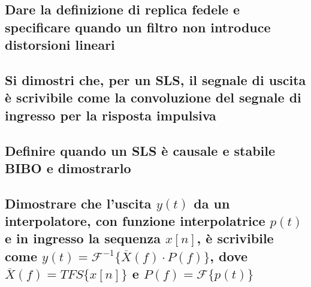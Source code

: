 \documentclass[12pt,oneside,openany]{memoir}
\numberwithin{equation}{subsection}
\begin{document}
\subsection{Dare la definizione di replica fedele e specificare quando un filtro
non introduce distorsioni lineari}


\subsection{Si dimostri che, per un SLS, il segnale di uscita \`e scrivibile
come la convoluzione del segnale di ingresso per la risposta impulsiva}


\subsection{Definire quando un SLS \`e causale e stabile BIBO e dimostrarlo}


\subsection{Dimostrare che l'uscita $y(t)$ da un interpolatore, con funzione
interpolatrice $p(t)$ e in ingresso la sequenza $x[n]$, \`e scrivibile come
$y(t) = \mathcal{F}^{-1}\{\overline{X}(f) \cdot P(f)\}$, dove $\overline{X}(f) =
TFS\{x[n]\}$ e $P(f) = \mathcal{F}\{p(t)\}$}

\end{document}
